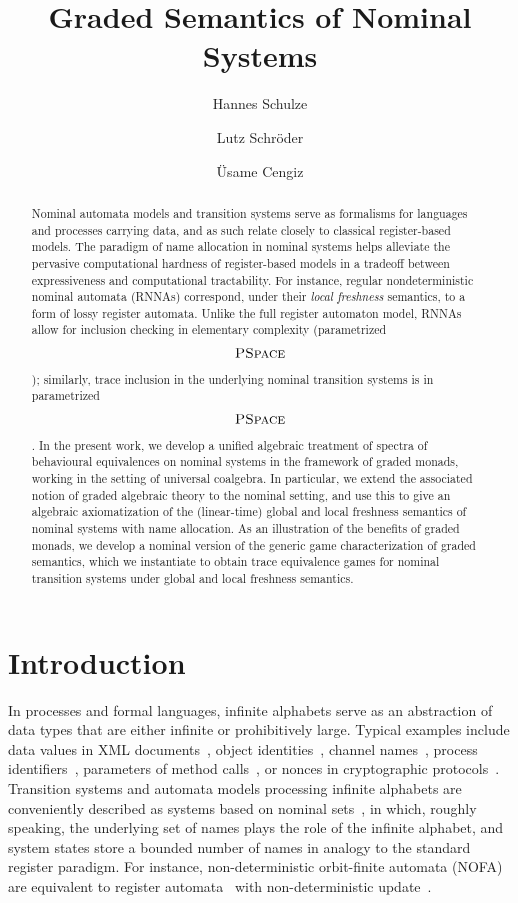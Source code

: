\documentclass[a4paper,UKenglish,cleveref,thm-restate,numberwithinsect,final]{lipics-v2021}
\title{Graded Semantics of Nominal Systems}
\author{Hannes Schulze}{Friedrich-Alexander-Universit\"{a}t Erlangen-N\"{u}rnberg, Germany}{}{https://orcid.org/0009-0000-4713-4338}{}
\author{Lutz Schr\"{o}der}{Friedrich-Alexander-Universit\"{a}t Erlangen-N\"{u}rnberg, Germany}{}{https://orcid.org/0000-0002-3146-5906}{Funded by the Deutsche Forschungsgemeinschaft (DFG, German Research Foundation) -- project number 517924115.}%
\author{\"{U}same Cengiz}{Friedrich-Alexander-Universit\"{a}t Erlangen-N\"{u}rnberg, Germany}{}{https://orcid.org/0009-0004-4092-7668}{Funded by the Deutsche Forschungsgemeinschaft (DFG, German Research Foundation) -- project number 419850228.}%
\theoremstyle{plain}
\numberwithin{equation}{section}
\newcommand{\+}[1]{\mathcal{#1}\xspace}
\theoremstyle{definition}
\newcommand\PSpace{$\textsc{PSpace}$\xspace}
\begin{document}
\maketitle

\begin{abstract} Nominal automata models and transition systems serve
  as formalisms for languages and processes carrying data, and as such
  relate closely to classical register-based models. The paradigm of
  name allocation in nominal systems helps alleviate the pervasive
  computational hardness of register-based models in a tradeoff
  between expressiveness and computational tractability. For instance,
  regular nondeterministic nominal automata (RNNAs) correspond, under
  their \emph{local freshness} semantics, to a form of lossy register
  automata. Unlike the full register automaton model, RNNAs allow for
  inclusion checking in elementary complexity (parametrized
  $\PSpace$); similarly, trace inclusion in the underlying nominal
  transition systems is in parametrized $\PSpace$. In the present
  work, we develop a unified algebraic treatment of spectra of
  behavioural equivalences on nominal systems in the framework of
  graded monads, working in the setting of universal coalgebra. In
  particular, we extend the associated notion of graded algebraic
  theory to the nominal setting, and use this to give an algebraic
  axiomatization of the (linear-time) global and local freshness
  semantics of nominal systems with name allocation. As an
  illustration of the benefits of graded monads, we develop a nominal
  version of the generic game characterization of graded semantics,
  which we instantiate to obtain trace equivalence games for nominal
  transition systems under global and local freshness semantics.
\end{abstract}

\section{Introduction}\label{sec:intro}

In processes and formal languages, infinite alphabets serve as an
abstraction of data types that are either infinite or prohibitively
large. Typical examples include data values in XML
documents~\cite{NevenEA04}, object identities~\cite{GrigoreEA13},
channel names~\cite{Hennessy02}, process
identifiers~\cite{BolligEA14}, parameters of method
calls~\cite{HowarEA19}, or nonces in cryptographic
protocols~\cite{KurtzEA07}. Transition systems and automata models
processing infinite alphabets are conveniently described as systems
based on nominal sets~\cite{BojanczykEA14,ParrowEA21}, in which,
roughly speaking, the underlying set of names plays the role of the
infinite alphabet, and system states store a bounded number of names
in analogy to the standard register paradigm. For instance,
non-deterministic orbit-finite automata (NOFA)~\cite{BojanczykEA14}
are equivalent to register automata~\cite{KaminskiFrancez94} with
non-deterministic update~\cite{KaminskiZeitlin10}.
\end{document}
